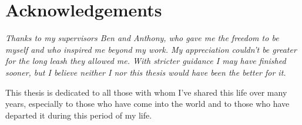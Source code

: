 
\section*{Acknowledgements}

\itshape
Thanks to my supervisors Ben and Anthony, who gave me the freedom to be myself and who inspired me beyond my work.
My appreciation couldn't be greater for the long leash they allowed me.
With stricter guidance I may have finished sooner, but I believe neither I nor this thesis would have been the better for it.

This thesis is dedicated to all those with whom I've shared this life over many years, especially to those who have come into the world and to those who have departed it during this period of my life.
\upshape
